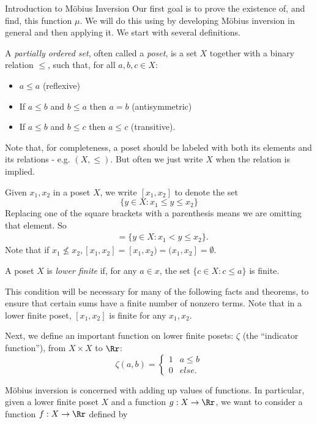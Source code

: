 \documentclass[12pt]{pom_thesis}
\begin{document}
\begin{chapter}{Introduction to M\"obius Inversion}
Our first goal is to prove the existence of, and find, this function $\mu$. We will do this using by developing M\"obius inversion in general and then applying it. We start with several definitions.

\begin{defn}
A \emph{partially ordered set}, often called a \emph{poset}, is a set $X$ together with a binary relation $\leq$, such that, for all $a,b,c \in X$:
\begin{itemize}
\item $a \leq a$ (reflexive)
\item If $a \leq b$ and $b \leq a$ then $a = b$ (antisymmetric)
\item If $a \leq b$ and $b \leq c$ then $a \leq c$ (transitive).
\end{itemize}
\end{defn}
Note that, for completeness, a poset should be labeled with both its elements and its relations - e.g. $(X, \leq)$. But often we just write $X$ when the relation is implied.
\begin{rmk}
Given $x_1, x_2$ in a poset $X$, we write $[x_1, x_2]$ to denote the set 
\[
\{y \in X: x_1 \leq y \leq x_2\}
\]
Replacing one of the square brackets with a parenthesis means we are omitting that element. So
\begin{align*}
[x_1, x_2) &= \{y \in X: x_1 \leq y < x_2\},\\
(x_1, x_2] &= \{y \in X: x_1 < y \leq x_2\}.
\end{align*}
Note that if $x_1 \nleq x_2, [x_1, x_2] = [x_1, x_2) = (x_1, x_2]= \emptyset.$
\end{rmk}
\begin{defn}
A poset $X$ is \emph{lower finite} if, for any $a \in x$, the set $\{ c \in X: c \leq a\}$ is finite.
\end{defn}
This condition will be necessary for many of the following facts and theorems, to ensure that certain sums have a finite number of nonzero terms. Note that in a lower finite poset, $[x_1, x_2]$ is finite for any $x_1, x_2$.

Next, we define an important function on lower finite posets: $\zeta$ (the ``indicator function''), from $X \times X$ to $\Rr$:
\[
\zeta(a,b) = \begin{cases} 1 & a \leq b \\ 0 & else. \end{cases}
\]

M\"obius inversion is concerned with adding up values of functions. In particular, given a lower finite poset $X$ and a function $g:X \rightarrow \Rr$, we want to consider a function $f:X \rightarrow \Rr$ defined by


\end{chapter}
\end{document}
